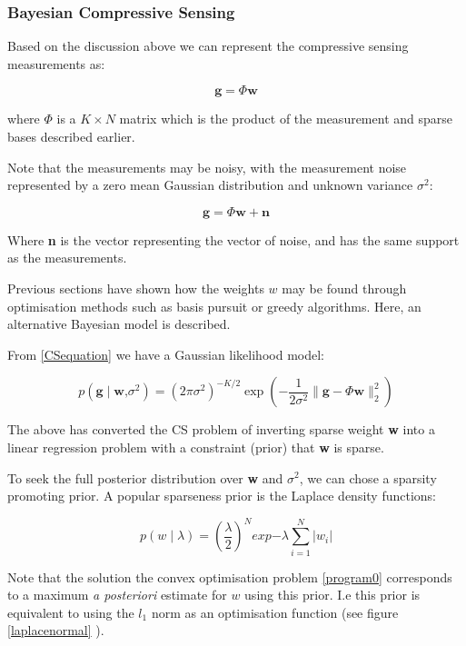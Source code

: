 \subsubsection{Bayesian Compressive Sensing}
Based on the discussion above we can represent the compressive sensing measurements as: 

\begin{equation}
\textbf{g} = \Phi	\textbf{w}
\end{equation}

where \(\Phi\) is a \(K \times	N\) matrix which is the product of the measurement and sparse bases described earlier.

Note that the measurements may be noisy, with the measurement noise represented by a zero mean Gaussian distribution and unknown variance \( \sigma^2 \):

\begin{equation}
\textbf{g} = \Phi \textbf{w} + \textbf{n}
\end{equation}
\label{CSequation}

Where \textbf{n} is the vector representing the vector of noise, and has the same support as the measurements. 

Previous sections have shown how the weights \(w\) may be found through optimisation methods such as basis pursuit or greedy algorithms. Here, an alternative Bayesian model is described.

From \ref{CSequation} we have a Gaussian likelihood model: 

\begin{equation}
p \left( \textbf{g} \mid \textbf{w}\text{,} \sigma^2 \right) = (2 \pi \sigma^2)^{-K/2} \exp{\left(- \frac{1}{2 \sigma^2} \|\textbf{g} - \Phi	\textbf{w}\|_{2}^{2} \right)} 
\end{equation}

The above has converted the CS problem of inverting sparse weight \textbf{w} into a linear regression problem with a constraint (prior) that \textbf{w} is sparse. 

To seek the full posterior distribution over \textbf{w} and \( \sigma^2 \), we can chose a sparsity promoting prior. A popular sparseness prior is the Laplace density functions:

\begin{equation}
p\left(w\mid\lambda\right) = \left(\frac{\lambda}{2}\right)^N exp{-\lambda \sum_{i=1}^{N} |w_i|}
\end{equation}

Note that the solution the convex optimisation problem \ref{program0} corresponds to a maximum \textit{a posteriori} estimate for \(w\) using this prior. I.e this prior is equivalent to using the \(l_1\) norm as an optimisation function (see figure \ref{laplacenormal} \cite{Tibshirani1996}).

